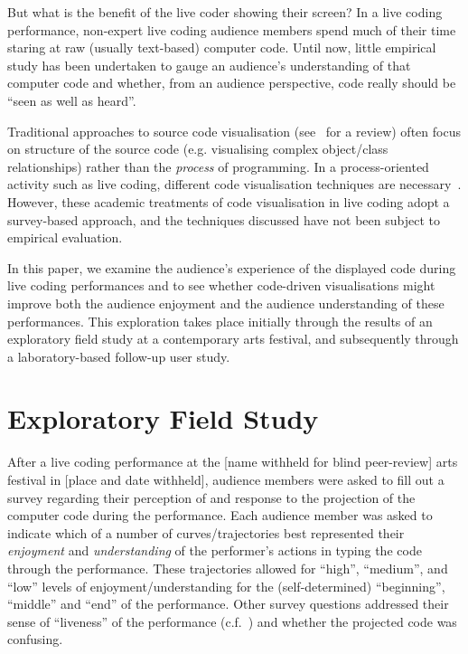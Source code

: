 \documentclass{sig-alternate}
\begin{document}
But what is the benefit of the live coder showing their screen? In a
live coding performance, non-expert live coding audience members spend
much of their time staring at raw (usually text-based) computer code.
Until now, little empirical study has been undertaken to gauge an
audience's understanding of that computer code and whether, from an
audience perspective, code really should be ``seen as well as heard''.

Traditional approaches to source code visualisation
(see~\cite{Novais2013} for a review) often focus on structure of the
source code (e.g. visualising complex object/class relationships)
rather than the \emph{process} of programming. In a process-oriented
activity such as live coding, different code visualisation techniques
are necessary~\cite{McLean2010b,Magnusson2013}. However, these
academic treatments of code visualisation in live coding adopt a
survey-based approach, and the techniques discussed have not been
subject to empirical evaluation.

In this paper, we examine the audience's experience of the displayed
code during live coding performances and to see whether code-driven
visualisations might improve both the audience enjoyment and the
audience understanding of these performances. This exploration takes
place initially through the results of an exploratory field study at a
contemporary arts festival, and subsequently through a laboratory-based
follow-up user study.

\section{Exploratory Field Study}

After a live coding performance at the [name withheld for blind
peer-review] arts festival in [place and date withheld], audience
members were asked to fill out a survey regarding their perception of
and response to the projection of the computer code during the
performance. Each audience member was asked to indicate which of a
number of curves/trajectories best represented their \emph{enjoyment}
and \emph{understanding} of the performer's actions in typing the code
through the performance. These trajectories allowed for ``high'',
``medium'', and ``low'' levels of enjoyment/understanding for the
(self-determined) ``beginning'', ``middle'' and ``end'' of the
performance. Other survey questions addressed their sense of
``liveness'' of the performance (c.f.~\cite{Auslander}) and whether
the projected code was confusing.
\end{document}
